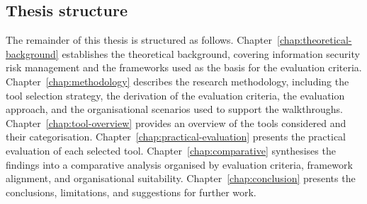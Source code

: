 \subsection{Thesis structure}

The remainder of this thesis is structured as follows.
Chapter~\ref{chap:theoretical-background} establishes the theoretical
background, covering information security risk management and the
frameworks used as the basis for the evaluation criteria.
Chapter~\ref{chap:methodology} describes the research methodology,
including the tool selection strategy, the derivation of the evaluation
criteria, the evaluation approach, and the organisational scenarios used
to support the walkthroughs. Chapter~\ref{chap:tool-overview} provides an
overview of the tools considered and their categorisation.
Chapter~\ref{chap:practical-evaluation} presents the practical evaluation
of each selected tool. Chapter~\ref{chap:comparative} synthesises the
findings into a comparative analysis organised by evaluation criteria,
framework alignment, and organisational suitability. Chapter~\ref{chap:conclusion}
presents the conclusions, limitations, and suggestions for further work.